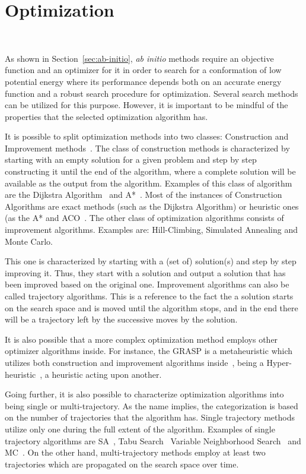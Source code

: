 \section{Optimization}~\label{sec:bioinspired}

As shown in Section~\ref{sec:ab-initio}, \textit{ab initio} methods require an
objective function and an optimizer for it in order to search for a
conformation of low potential energy where its performance depends both on an
accurate energy function and a robust search procedure for optimization.
Several search methods can be utilized for this purpose. However, it is
important to be mindful of the properties that the selected optimization
algorithm has.

It is possible to split optimization methods into two classes: Construction and
Improvement methods~\cite{russell2016artificial}. The class of construction
methods is characterized by starting with an empty solution for a given problem
and step by step constructing it until the end of the algorithm, where a
complete solution will be available as the output from the algorithm. Examples
of this class of algorithm are the Dijkstra
Algorithm~\cite{dijkstra1959dijkstra} and A*~\cite{hart1968formal}. Most of the
instances of Construction Algorithms are exact methods (such as the Dijkstra
Algorithm) or heuristic ones (as the A* and \ac{ACO}~\cite{dorigo1999ant}.  The
other class of optimization algorithms consists of improvement algorithms.
Examples are: Hill-Climbing, Simulated Annealing and Monte Carlo.

This
one is characterized by starting with a (set of) solution(s) and step by step
improving it. Thus, they start with a solution and output a solution that has
been improved based on the original one. Improvement algorithms can also be
called trajectory algorithms. This is a reference to the fact the a solution
starts on the search space and is moved until the algorithm stops, and in the
end there will be a trajectory left by the successive moves by the solution.

It is also possible that a more complex optimization method employs other
optimizer algorithms inside. For instance, the \ac{GRASP} is a metaheuristic
which utilizes both construction and improvement algorithms
inside~\cite{feo1995greedy}, %
being a Hyper-heuristic~\cite{burke2003hyper}, a heuristic acting upon another.

Going further, it is also possible to characterize optimization algorithms into
being single or multi-trajectory. As the name implies, the categorization is
based on the number of trajectories that the algorithm has. Single trajectory
methods utilize only one during the full extent of the algorithm. Examples of
single trajectory algorithms are \ac{SA}~\cite{kirkpatrick1983optimization},
Tabu Search~\cite{glover1998tabu} Variable Neighborhood
Search~\cite{mladenovic1997variable} and \ac{MC}~\cite{hastings1970monte}. On
the other hand, multi-trajectory methods employ at least two trajectories which
are propagated on the search space over time.

